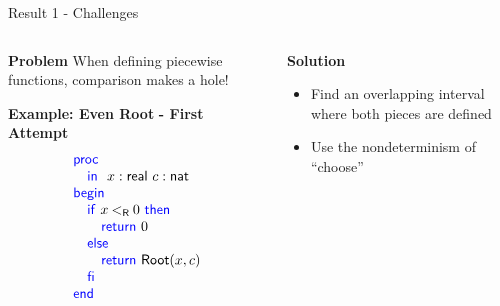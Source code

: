 \begin{frame}{Result 1 - Challenges}
\begin{columns}
    \begin{column}{0.4\linewidth}
        \vspace{-2em}
        \begin{exampleblock}{\color{BrickRed}\textbf{Problem}}
            When defining piecewise functions, comparison makes a hole! 
        \end{exampleblock}
        \pause
        \vspace{0.75em}
        {\textbf{\color{Mahogany}Example: Even Root} \pause \textbf{\color{BrickRed} - First Attempt}\\}
        \footnotesize
        \vspace{-1em}
        \[ 
            \BLOCK{
            \PROC  \\
                \INDENT{
                \IN\ x:\real\ c:\nat}\\
            \BEGIN \\
                \INDENT{
                \IF x \realLess 0 \THEN \\
                    \INDENT{
                    \RETURN 0}\\
                \ELSE \\
                    \INDENT{
                    \RETURN \mathsf{Root}(x,c)}\\
                \FI \\

                }\\
            \END}
        \] 
        \pause
    \end{column}
    \pause
    \begin{column}{0.50\linewidth}
        \vspace{-2em}
        \begin{exampleblock}{\color{OliveGreen}\textbf{Solution}}
            \begin{itemize}
                \pause \item Find an overlapping interval where both pieces are defined
                \pause \item Use the nondeterminism of ``choose''  
            \end{itemize}                       
        \end{exampleblock}  
    \end{column}
\end{columns}
\end{frame}

